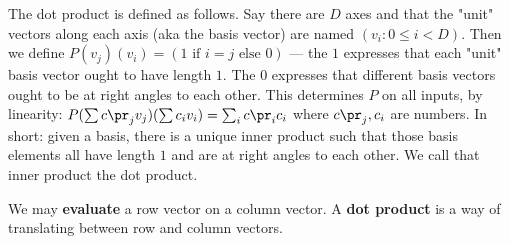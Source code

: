         The dot product is defined as follows.  Say there are $D$ axes and that
        the "unit" vectors along each axis (aka the basis vector) are named
        $(v_i:0\leq i<D)$.  Then we define $P(v_j)(v_i) = (1 \text{ if } i=j
        \text{ else } 0)$ --- the $1$ expresses that each "unit" basis vector
        ought to have length $1$.  The $0$ expresses that different basis
        vectors ought to be at right angles to each other.  This determines $P$
        on all inputs, by linearity: $P(\sum c\pr_j v_j)(\sum c_i v_i)=\sum_i
        c\pr_i c_i$ where $c\pr_j,c_i$ are numbers.  In short: given a basis,
        there is a unique inner product such that those basis elements all have
        length $1$ and are at right angles to each other.  We call that inner
        product the dot product.


        We may \textbf{evaluate} a row vector on a column vector.   A \textbf{dot product} is a way of translating between row and
        column vectors.  




